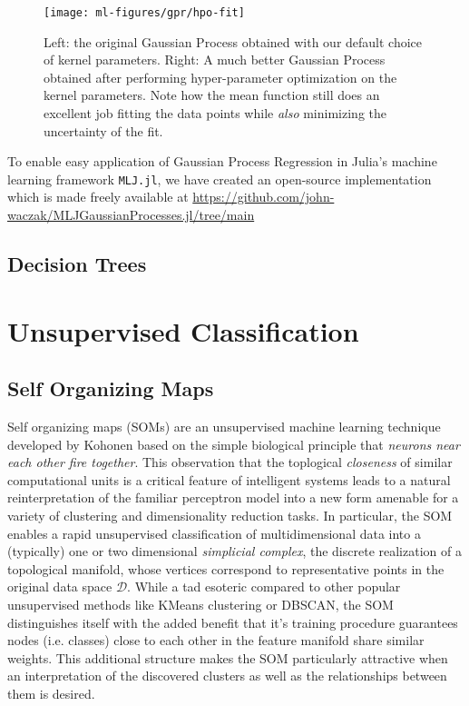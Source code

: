 \begin{figure}[h]
  \centering
  \texttt{[image: ml-figures/gpr/hpo-fit]}
  \caption{Left: the original Gaussian Process obtained with our default choice of kernel parameters. Right: A much better Gaussian Process obtained after performing hyper-parameter optimization on the kernel parameters. Note how the mean function still does an excellent job fitting the data points while \textit{also} minimizing the uncertainty of the fit.}
  \label{fig:gpr-fit-comparison}
\end{figure}

To enable easy application of Gaussian Process Regression in Julia's machine learning framework \texttt{MLJ.jl}, we have created an open-source implementation which is made freely available at \url{https://github.com/john-waczak/MLJGaussianProcesses.jl/tree/main}

\subsection{Decision Trees}



\section{Unsupervised Classification}


\subsection{Self Organizing Maps}

Self organizing maps (SOMs) are an unsupervised machine learning technique developed by Kohonen \cite{kohonen-original} based on the simple biological principle that \textit{neurons near each other fire together}. This observation that the toplogical \textit{closeness} of similar computational units is a critical feature of intelligent systems leads to a natural reinterpretation of the familiar perceptron model into a new form amenable for a variety of clustering and dimensionality reduction tasks. In particular, the SOM enables a rapid unsupervised classification of multidimensional data into a (typically) one or two dimensional \textit{simplicial complex}, the discrete realization of a topological manifold, whose vertices correspond to representative points in the original data space $\mathcal{D}$. While a tad esoteric compared to other popular unsupervised methods like KMeans clustering or DBSCAN, the SOM distinguishes itself with the added benefit that it's training procedure guarantees nodes (i.e. classes) close to each other in the feature manifold share similar weights. This additional structure makes the SOM particularly attractive when an interpretation of the discovered clusters as well as the relationships between them is desired.

